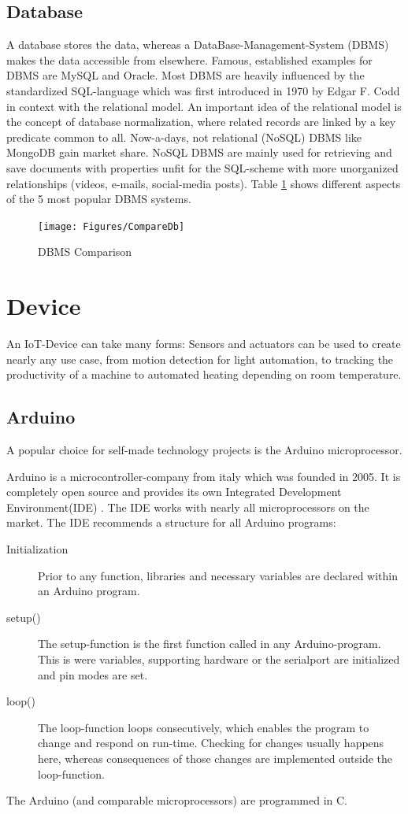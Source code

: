 \subsection{Database}
A database stores the data, whereas a DataBase-Management-System (DBMS) makes the data accessible from elsewhere.
Famous, established examples for DBMS are MySQL and Oracle.
Most DBMS are heavily influenced by the standardized SQL-language which was first introduced in 1970 by Edgar F. Codd in context with the relational model.
An important idea of the relational model is the concept of database normalization, where related records are linked by a key predicate common to all.
Now-a-days, not relational (NoSQL) DBMS like MongoDB gain market share. 
NoSQL DBMS are mainly used for retrieving and save documents with properties unfit for the SQL-scheme with more unorganized relationships (videos, e-mails, social-media posts).
Table \ref{fig:CompareDb} shows different aspects of the 5 most popular DBMS systems.

\begin{figure}[b]
	\centering
    \texttt{[image: Figures/CompareDb]}
	\decoRule
	\caption[DBMS Comparison]{DBMS Comparison}
	\label{fig:CompareDb}
\end{figure}

\section{Device}
An IoT-Device can take many forms: 
Sensors and actuators can be used to create nearly any use case, 
from motion detection for light automation, to tracking the productivity of a machine to automated heating depending on room temperature.

\subsection{Arduino}
A popular choice for self-made technology projects is the Arduino microprocessor.

Arduino is a microcontroller-company from italy which was founded in 2005. 
It is completely open source and provides its own Integrated Development Environment(IDE) \parencite{arduinoIDEDownload}.
The IDE works with nearly all microprocessors on the market. 
The IDE recommends a structure for all Arduino programs:
\begin{description}
    \item [Initialization]
    Prior to any function, libraries and necessary variables are declared within an Arduino program.
    \item [setup()]
    The setup-function is the first function called in any Arduino-program. 
    This is were variables, supporting hardware or the serialport are initialized and pin modes are set. 
    \item [loop()]
    The loop-function loops consecutively, 
    which enables the program to change and respond on run-time.
    Checking for changes usually happens here, 
    whereas consequences of those changes are implemented outside the loop-function.    
\end{description}
The Arduino (and comparable microprocessors) are programmed in C.

